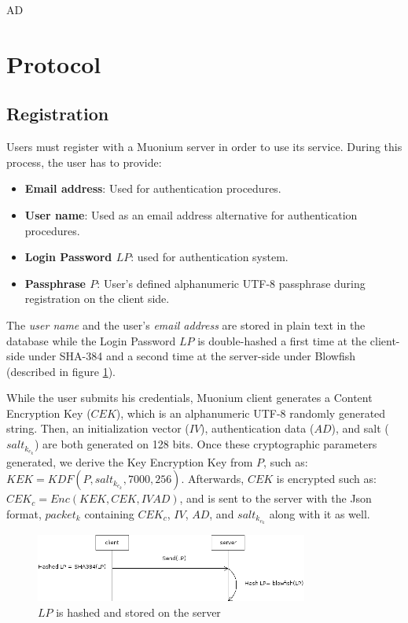 AD\documentclass[a4paper,10pt]{article}
\begin{document}
\section{Protocol}
\subsection{Registration}
Users must register with a Muonium server in order to use its service. During this process, the user has to provide:

\begin{itemize}
    \item \textbf{Email address}: Used for authentication procedures.
    \item \textbf{User name}: Used as an email address alternative for authentication procedures.
    \item \textbf{Login Password $LP$}: used for authentication system.
    \item \textbf{Passphrase $P$}:
		User's defined alphanumeric UTF-8 passphrase during registration on the client side.
\end{itemize}

The \emph{user name} and the user's \emph{email address} are stored in plain text in the database while the Login
Password $LP$ is double-hashed a first time at the client-side under SHA-384 and a second time at the server-side
under Blowfish (described in figure \ref{Fig:fig1}).

While the user submits his credentials, Muonium client generates a Content Encryption Key ($CEK$),
which is an alphanumeric UTF-8 randomly generated string.
Then, an initialization vector ($IV$), authentication data ($AD$), and salt ($salt_k_e_k$) are both generated on 128 bits.
Once these cryptographic parameters generated, we derive the Key Encryption Key from $P$, such as: $KEK=KDF(P, salt_k_e_k, 7000, 256)$.
Afterwards, $CEK$ is encrypted such as: $CEK_c=Enc(KEK, CEK, IV AD)$, and is sent to the server with the Json format, $packet_k$ containing
$CEK_c$, $IV$, $AD$, and $salt_k_e_k$ along with it as well.

\begin{figure}[!h]
\centering
\includegraphics[width=0.8\textwidth]{diagram/figure1}
\caption{$LP$ is hashed and stored on the server}
\label{Fig:fig1}
\end{figure}
\end{document}
